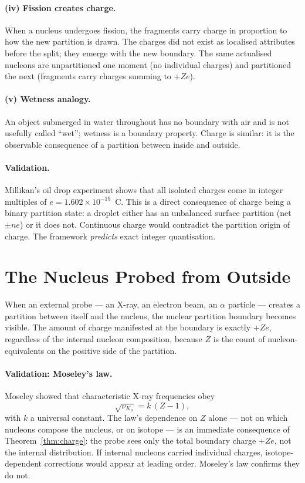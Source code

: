 \documentclass[11pt,a4paper]{article}
\theoremstyle{definition}
\theoremstyle{remark}
\begin{document}
\paragraph{(iv) Fission creates charge.} When a nucleus undergoes fission, the fragments carry charge in proportion to how the new partition is drawn. The charges did not exist as localised attributes before the split; they emerge with the new boundary. The same actualised nucleons are unpartitioned one moment (no individual charges) and partitioned the next (fragments carry charges summing to $+Ze$).

\paragraph{(v) Wetness analogy.} An object submerged in water throughout has no boundary with air and is not usefully called ``wet''; wetness is a boundary property. Charge is similar: it is the observable consequence of a partition between inside and outside.

\paragraph{Validation.} Millikan's oil drop experiment \citep{millikan1913} shows that all isolated charges come in integer multiples of $e = 1.602\times 10^{-19}$~C. This is a direct consequence of charge being a binary partition state: a droplet either has an unbalanced surface partition (net $\pm ne$) or it does not. Continuous charge would contradict the partition origin of charge. The framework \emph{predicts} exact integer quantisation.

\section{The Nucleus Probed from Outside}
\label{sec:probed}

When an external probe --- an X-ray, an electron beam, an $\alpha$ particle --- creates a partition between itself and the nucleus, the nuclear partition boundary becomes visible. The amount of charge manifested at the boundary is exactly $+Ze$, regardless of the internal nucleon composition, because $Z$ is the count of nucleon-equivalents on the positive side of the partition.

\paragraph{Validation: Moseley's law.} Moseley \citep{moseley1913, moseley1914} showed that characteristic X-ray frequencies obey
\[
\sqrt{\nu_{K_\alpha}} = k\,(Z - 1),
\]
with $k$ a universal constant. The law's dependence on $Z$ alone --- not on which nucleons compose the nucleus, or on isotope --- is an immediate consequence of Theorem~\ref{thm:charge}: the probe sees only the total boundary charge $+Ze$, not the internal distribution. If internal nucleons carried individual charges, isotope-dependent corrections would appear at leading order. Moseley's law confirms they do not.
\end{document}
